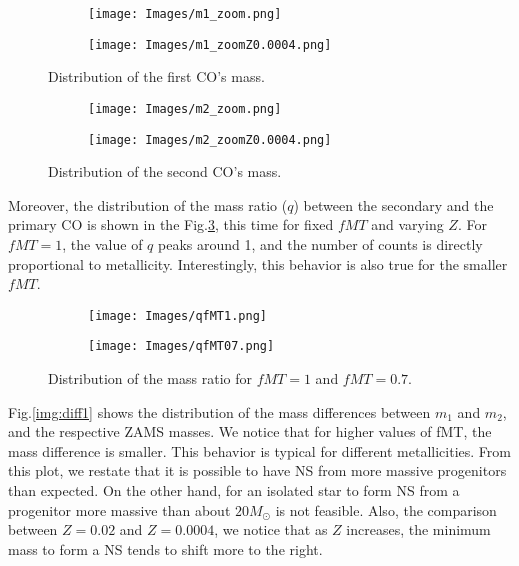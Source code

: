\documentclass[preprint,12pt]{elsarticle}
\begin{document}
\begin{figure}[ht]
    \centering
    \begin{subfigure}[t]{0.45\textwidth}
        \centering
        \texttt{[image: Images/m1\_zoom.png]}
    \end{subfigure}
    \begin{subfigure}[t]{0.45\textwidth}
    \centering
        \texttt{[image: Images/m1\_zoomZ0.0004.png]}
    \end{subfigure}
    \caption{Distribution of the first CO's mass.}
    \label{img:m1_zoom}
\end{figure}
    
\begin{figure}[ht]
    \centering
    \begin{subfigure}[t]{0.45\textwidth}
        \centering
        \texttt{[image: Images/m2\_zoom.png]}   
    \end{subfigure}
    \begin{subfigure}[t]{0.45\textwidth}
    \centering \texttt{[image: Images/m2\_zoomZ0.0004.png]}
    \end{subfigure}
    \caption{Distribution of the second CO's mass.}
    \label{img:m2_zoom}
\end{figure}

Moreover, the distribution of the mass ratio ($q$) between the secondary and the primary CO is shown in the Fig.\ref{img:q}, this time for fixed $fMT$ and varying $Z$.
For $fMT=1$, the value of $q$ peaks around 1, and the number of counts is directly proportional to metallicity.  Interestingly, this behavior is also true for the smaller $fMT$.

\begin{figure}[h]
    \centering
    \begin{subfigure}[t]{0.45\textwidth}
        \centering
        \texttt{[image: Images/qfMT1.png]}
    \end{subfigure}
    \begin{subfigure}[t]{0.45\textwidth}
        \centering    
        \texttt{[image: Images/qfMT07.png]}
    \end{subfigure}
\caption{Distribution of the mass ratio for $fMT=1$ and $fMT=0.7$.}
\label{img:q}
\end{figure}
\newpage

Fig.\ref{img:diff1} shows the distribution of the mass differences between $m_1$ and $m_2$, and the respective ZAMS masses. We notice that for higher values of fMT, the mass difference is smaller. This behavior is typical for different metallicities. From this plot, we restate that it is possible to have NS from more massive progenitors than expected. On the other hand, for an isolated star to form NS from a progenitor more massive than about $20M_{\odot}$ is not feasible. Also, the comparison between $Z=0.02$ and $Z=0.0004$, we notice that as $Z$ increases, the minimum mass to form a NS tends to shift more to the right. 
\end{document}
